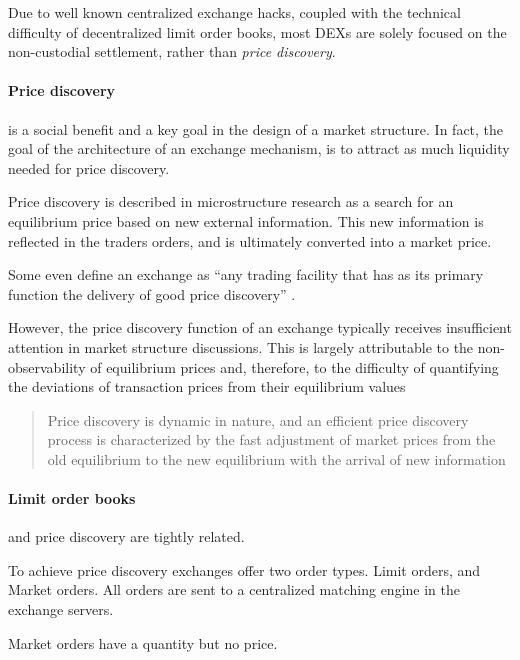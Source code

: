 \documentclass[12pt]{article}
\begin{document}
Due to well known centralized exchange hacks, coupled with the technical difficulty of decentralized limit order books, most DEXs are solely focused on the non-custodial settlement, rather than \emph{price discovery}. 


\paragraph*{Price discovery} is a social benefit and a key goal in the design of a market structure. In fact, the goal of the architecture of an exchange mechanism, is to attract as much liquidity needed for price discovery.  \cite{francioni_schwartz_2017}

Price discovery is described in microstructure research as a search for an equilibrium price based on new external information. This new information is reflected in the traders orders, and is ultimately converted into a market price. \citep{RePEc:nbr:nberwo:6257}

Some even define an exchange as ``any trading facility that has as its primary function the delivery of good price discovery'' \cite{francioni_schwartz_2017}. 

However, the price discovery function of an  exchange typically receives insufficient attention in market structure discussions. This is largely attributable to the non-observability of equilibrium prices and, therefore, to the difficulty of quantifying the deviations of transaction prices from their equilibrium values \cite{francioni_schwartz_2017}


\begin{quote}
Price discovery is dynamic in nature, and an efficient price discovery process is characterized by the fast adjustment of market prices from the old equilibrium to the new equilibrium with the arrival of new information \cite{RePEc:udb:wpaper:uwec-2005-01-r}    
\end{quote}

\paragraph*{Limit order books} and price discovery are tightly related. \citep{RePEc:nbr:nberwo:6257} \cite{RePEc:eee:jfinec:v:17:y:1986:i:1:p:5-26}

To achieve price discovery exchanges offer two order types. Limit orders, and Market orders. All orders are sent to a centralized matching engine in the exchange servers. 

Market orders have a quantity but no price. 
\end{document}
